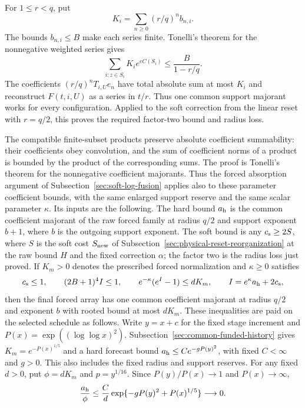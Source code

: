 For $1\le r<q$, put
\[
             K_i=\sum_{n\ge0}(r/q)^n b_{n,i}.
\]
The bounds $b_{n,i}\le B$ make each series finite. Tonelli's
theorem for the nonnegative weighted series gives
\[
                 \sum_{i:z\in S_i}K_i e^{e C(S_i)}
                              \le\frac{B}{1-r/q}.
\]
The coefficients $(r/q)^nT_{i,U}e_n$ have total absolute sum
at most $K_i$ and reconstruct $F(t,i,U)$ as a series in $t/r$.
Thus one common support majorant works for every configuration.
Applied to the soft correction from the linear reset with
$r=q/2$, this proves the required factor-two bound and radius loss.

The compatible
finite-subset products preserve absolute coefficient summability:
their coefficients obey convolution, and the sum of coefficient
norms of a product is bounded by the product of the corresponding
sums. The proof is Tonelli's theorem for the nonnegative coefficient
majorants. Thus the forced absorption argument of
Subsection~\ref{sec:soft-log-fusion} applies also to
these parameter coefficient bounds, with the same enlarged
support reserve and the same scalar parameter $\kappa$.
Its inputs are the following. The hard bound $a_{\rm h}$ is the
common coefficient majorant of the raw forced family at radius $q/2$
and support exponent $b+1$, where $b$ is the outgoing support
exponent. The soft bound is any $c_{\rm s}\ge2S$, where $S$ is the
soft cost $S_{\rm new}$ of
Subsection~\ref{sec:physical-reset-reorganization} at the raw bound $H$
and the fixed correction $\alpha$; the factor two is the radius loss
just proved. If $K_m>0$ denotes the prescribed forced normalization
and $\kappa\ge0$ satisfies
\begin{equation}\label{eq:background-forced-payment}
 c_{\rm s}\le1,\qquad (2B+1)^4I\le1,\qquad
 e^{-\kappa}(e^I-1)\le dK_m,\qquad I=e^\kappa a_{\rm h}+2c_{\rm s},
\end{equation}
then the final forced array has one common coefficient majorant at
radius $q/2$ and exponent $b$ with rooted bound at most $dK_m$.
These inequalities are paid on the selected schedule as follows.
Write $y=x+c$ for the fixed stage increment and
$P(x)=\exp((\log\log x)^2)$. Subsection~\ref{sec:common-funded-history}
gives $K_m=e^{-P(x)^{1/5}}$ and a hard forecast bound
$a_{\rm h}\le C e^{-gP(y)^2}$, with fixed $C<\infty$ and $g>0$.
This also includes the fixed radius and support reserves. For any fixed
$d>0$, put $\phi=dK_m$ and $p=y^{1/16}$. Since
$P(y)/P(x)\to1$ and $P(x)\to\infty$,
\[
 \frac{a_{\rm h}}{\phi}
 \leq\frac Cd\exp\{-gP(y)^2+P(x)^{1/5}\}\longrightarrow0.
\]
